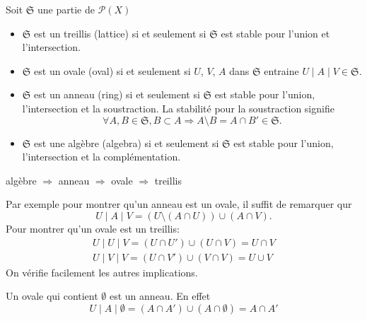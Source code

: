 \begin{defi}
  Soit $\mathfrak{S}$ une partie de $\mathcal{P}(X)$
  \begin{itemize}
    \item $\mathfrak{S}$ est un treillis (lattice) si et seulement si $\mathfrak{S}$ est stable pour l'union et l'intersection.
    \item $\mathfrak{S}$ est un ovale (oval) si et seulement si $U$, $V$, $A$ dans $\mathfrak{S}$ entraine $U \mid A \mid V \in \mathfrak{S}$.
    \item $\mathfrak{S}$ est un anneau (ring) si et seulement si $\mathfrak{S}$ est stable pour l'union, l'intersection et la soustraction. La stabilité pour la soustraction signifie
    \begin{displaymath}
      \forall A, B \in \mathfrak{S}, B \subset A \Rightarrow A \setminus B = A \cap B' \in \mathfrak{S}.
    \end{displaymath}
    \item $\mathfrak{S}$ est une algèbre (algebra) si et seulement si $\mathfrak{S}$ est stable pour l'union, l'intersection et la complémentation.
  \end{itemize}
\end{defi}

\begin{prop}
  algèbre $\Rightarrow$ anneau $\Rightarrow$ ovale $\Rightarrow$ treillis
\end{prop}
\begin{demo}
Par exemple pour montrer qu'un anneau est un ovale, il suffit de remarquer qur 
\begin{displaymath}
  U \mid A \mid V = (U \setminus (A \cap U)) \cup (A \cap V).
\end{displaymath}
Pour montrer qu'un ovale est un treillis:
\begin{align*}
  U \mid U \mid V = (U \cap U') \cup (U \cap V) = U \cap V \\
  U \mid V \mid V = (U \cap V') \cup (V \cap V) = U \cup V
\end{align*}
On vérifie facilement les autres implications.
\end{demo}
\begin{rem}
  Un ovale qui contient $\emptyset$ est un anneau. En effet
  \begin{displaymath}
    U \mid A \mid \emptyset = (A \cap A')\cup (A \cap \emptyset) = A \cap A'
  \end{displaymath}
\end{rem}


